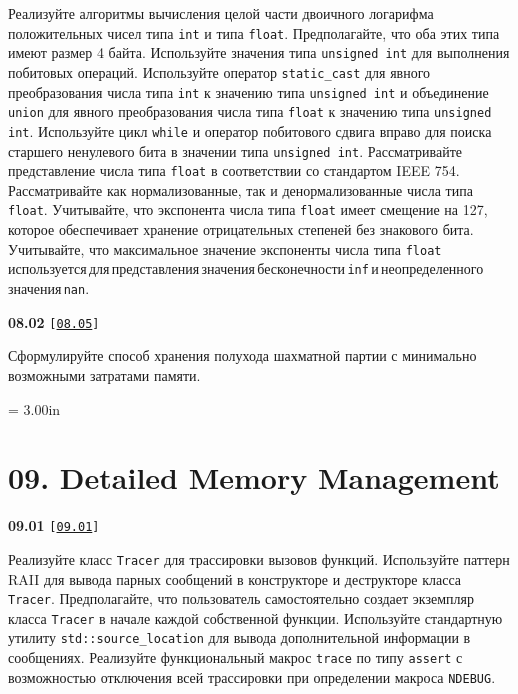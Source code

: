 \documentclass[a4paper,12pt]{article}
\begin{document}
Реализуйте алгоритмы вычисления целой части двоичного логарифма положительных чисел типа \lstinline{int} и типа \lstinline{float}. Предполагайте, что оба этих типа имеют размер 4 байта. Используйте значения типа \lstinline{unsigned int} для выполнения побитовых операций. Используйте оператор \lstinline{static_cast} для явного преобразования числа типа \lstinline{int} к значению типа \lstinline{unsigned int} и объединение \lstinline{union} для явного преобразования числа типа \lstinline{float} к значению типа \lstinline{unsigned int}. Используйте цикл \lstinline{while} и оператор побитового сдвига вправо для поиска старшего ненулевого бита в значении типа \lstinline{unsigned int}. Рассматривайте представление числа типа \lstinline{float} в соответствии со стандартом IEEE 754. Рассматривайте как нормализованные, так и денормализованные числа типа \lstinline{float}. Учитывайте, что экспонента числа типа \lstinline{float} имеет смещение на 127, которое обеспечивает хранение отрицательных степеней без знакового бита. Учитывайте, что максимальное значение экспоненты числа типа \lstinline{float}\,используется\,для\,представления\,значения\,бесконечности\,\lstinline{inf}\,и\,неопределенного\,значения\,\lstinline{nan}.

\bigskip

{\large \textbf{08.02} \texttt{[\href{https://github.com/i-s-m-mipt/Education/blob/master/projects/examples/source/08.05.cpp}{\texttt{08.05}}]}}

\bigskip

Сформулируйте способ хранения полухода шахматной партии с минимально возможными затратами памяти.



\newpage\thispagestyle{empty}\pdfpageheight = 3.00in\enlargethispage{100in}

\section{09. Detailed Memory Management}

{\large \textbf{09.01} \texttt{[\href{https://github.com/i-s-m-mipt/Education/blob/master/projects/examples/source/09.01.cpp}{\texttt{09.01}}]}}

\bigskip

Реализуйте класс \lstinline{Tracer} для трассировки вызовов функций. Используйте паттерн RAII для вывода парных сообщений в конструкторе и деструкторе класса \lstinline{Tracer}. Предполагайте, что пользователь самостоятельно создает экземпляр класса \lstinline{Tracer} в начале каждой собственной функции. Используйте стандартную утилиту \lstinline{std::source_location} для вывода дополнительной информации в сообщениях. Реализуйте функциональный макрос \lstinline{trace} по типу \lstinline{assert} с возможностью отключения всей трассировки при определении макроса \lstinline{NDEBUG}. 
\end{document}
